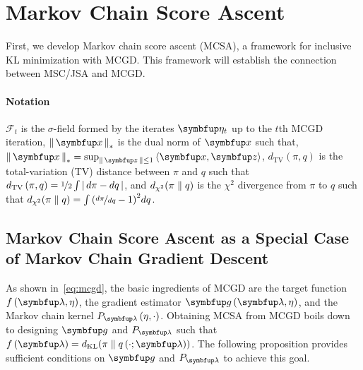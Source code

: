 
\vspace{-1.5ex}
\section{Markov Chain Score Ascent}\label{section:mcsa}
\vspace{-1.0ex}

First, we develop Markov chain score ascent (MCSA), a framework for inclusive KL minimization with MCGD.
This framework will establish the connection between MSC/JSA and MCGD.

\vspace{-1.5ex}
{
\paragraph{Notation}
\(\mathcal{F}_t\) is the \(\sigma\)-field formed by the iterates \(\veta_t\) up to the \(t\)th MCGD iteration, \(\norm{\vx}_* \) is the dual norm of \(\vx\) such that, \(\norm{\vx}_* = \sup_{\norm{\vz} \leq 1} \iprod{\vx}{\vz}\), \(d_{\text{TV}}\left(\pi, q\right)\) is the total-variation (TV) distance between \(\pi\) and \(q\) such that \(d_{\text{TV}}\left(\pi, q\right) = \nicefrac{1}{2} \int {\left|\,d\pi - dq\,\right|} \), and \(d_{\chi^2}(\pi\parallel q)\) is the \(\chi^2\) divergence from \(\pi\) to \(q\) such that \(d_{\chi^2}(\pi\parallel q) = \int {\left(\nicefrac{d\pi}{dq} - 1\right)}^2 dq\).
}

\vspace{-1.ex}
\subsection{Markov Chain Score Ascent as a Special Case of Markov Chain Gradient Descent}\label{section:convergence}
\vspace{-1.ex}
As shown in~\cref{eq:mcgd}, the basic ingredients of MCGD are the target function \(f\left(\vlambda, \eta\right)\), the gradient estimator \(\vg\left(\vlambda, \eta\right)\), and the Markov chain kernel \(P_{\vlambda}\left(\eta, \cdot\right)\).
Obtaining MCSA from MCGD boils down to designing \(\vg\) and \(P_{\vlambda}\) such that \(f\left(\vlambda\right) = \DKL{\pi}{q\left(\cdot; \vlambda\right)} \).
The following proposition provides sufficient conditions on \(\vg\) and \(P_{\vlambda}\) to achieve this goal.

\vspace{0.07in}


